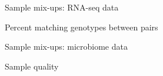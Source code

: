 \documentclass[aspectratio=169,12pt,t]{beamer}
\begin{document}
\begin{frame}[c]{}

\centerline{\Large \color{title} Sample mix-ups: RNA-seq data}

\note{
}

\end{frame}



\begin{frame}[c]{Percent matching genotypes between pairs}

\note{
}
\end{frame}








\begin{frame}[c]{}

\centerline{\Large \color{title} Sample mix-ups: microbiome data}

\note{
}

\end{frame}









\begin{frame}[c]{}

\centerline{\Large \color{title} Sample quality}

\note{
}

\end{frame}









\end{document}
